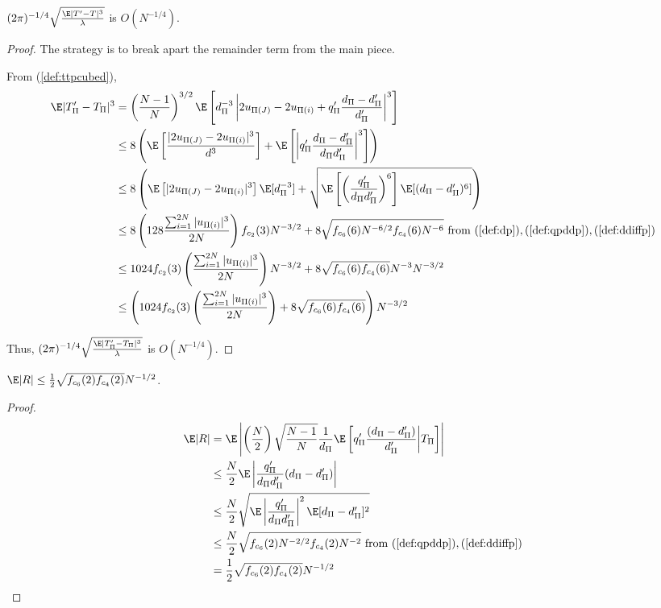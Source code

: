 \begin{proposition}
  $(2\pi)^{-1/4}\sqrt{\frac{\E|T'-T|^3}{\lambda}}$ is
  $O(N^{-1/4})$.
\end{proposition}
\begin{proof}
  The strategy is to break apart the remainder term from the main piece.  

  From (\ref{def:ttpcubed}),
  \begin{align*}
    \E|T_{\Pi}'-T_{\Pi}|^3 
    &= \left (\frac{N-1}{N}\right )^{3/2}
    \E \left [d_{\Pi}^{-3} \left |2u_{\Pi(J)}-2u_{\Pi(i)}+q_{\Pi}'\frac{d_{\Pi}-d_{\Pi}'}{d_{\Pi}'} \right |^3
    \right ] \\
    &\leq 8 \left (
      \E \left [ \frac{|2u_{\Pi(J)}-2u_{\Pi(i)}|^3}{d^3} \right ] + 
      \E \left [ \left | q_{\Pi}'\frac{d_{\Pi}-d_{\Pi}'}{d_{\Pi}d_{\Pi}'} \right |^3
      \right ] \right ) \\
    &\leq 8 \left (
      \E \left [ |2u_{\Pi(J)}-2u_{\Pi(i)}|^3 \right ] \E [d_{\Pi}^{-3}] + 
      \sqrt{\E \left [ \left ( \frac{q_{\Pi}'}{d_{\Pi}d_{\Pi}'} \right )^6 \right ]  \E
        [(d_{\Pi}-d_{\Pi}')^6]} \right ) \\
    &\leq 8 \left ( 128 \frac{\sum_{i=1}^{2N} |u_{\Pi(i)}|^3}{2N} \right )
    f_{c_2}(3) N^{-3/2} + 
    8 \sqrt{f_{c_6}(6) N^{-6/2} f_{c_4}(6) N^{-6}} \text{ from } 
    (\ref{def:dp}),(\ref{def:qpddp}),(\ref{def:ddiffp}) \\
    &\leq 1024 f_{c_2}(3) \left ( \frac{\sum_{i=1}^{2N} |u_{\Pi(i)}|^3}{2N}
    \right ) N^{-3/2} + 8 \sqrt{f_{c_6}(6)f_{c_4}(6)} N^{-3} N^{-3/2} \\
    &\leq \left ( 1024 f_{c_2}(3) \left ( \frac{\sum_{i=1}^{2N} |u_{\Pi(i)}|^3}{2N}
    \right ) + 8 \sqrt{f_{c_6}(6)f_{c_4}(6)} \right ) N^{-3/2}
  \end{align*}

  Thus, $(2\pi)^{-1/4}\sqrt{\frac{\E|T_{\Pi}'-T_{\Pi}|^3}{\lambda}}$ is $O(N^{-1/4})$.
\end{proof}

\begin{proposition}
  $\E|R| \leq \frac{1}{2}\sqrt{f_{c_6}(2)f_{c_4}(2)} N^{-1/2}$.
\end{proposition}
\begin{proof}
  \begin{align*}
    \E|R| &= \E \left | \left (\frac{N}{2}\right )
      \sqrt{\frac{N-1}{N}}\frac{1}{d_{\Pi}}\E
      \left [q_{\Pi}'\frac{(d_{\Pi}-d_{\Pi}')}{d_{\Pi}'} \middle | T_{\Pi} \right ]\right | \\
    &\leq \frac{N}{2} \E \left | \frac{q_{\Pi}'}{d_{\Pi}d_{\Pi}'}(d_{\Pi}-d_{\Pi}') \right | \\
    &\leq \frac{N}{2} \sqrt{\E \left | \frac{q_{\Pi}'}{d_{\Pi}d_{\Pi}'} \right |^2
      \E[d_{\Pi}-d_{\Pi}']^2} \\
    &\leq \frac{N}{2} \sqrt{f_{c_6}(2) N^{-2/2} f_{c_4}(2) N^{-2}}
    \text{ from } (\ref{def:qpddp}), (\ref{def:ddiffp}) \\
    &=\frac{1}{2}\sqrt{f_{c_6}(2)f_{c_4}(2)} N^{-1/2}
  \end{align*}
\end{proof}

